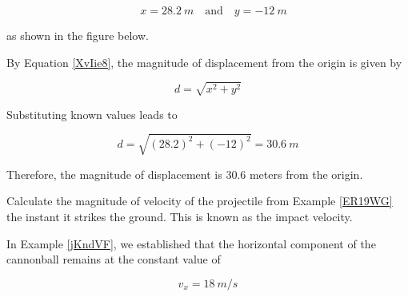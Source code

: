 \documentclass[main-physics.tex]{subfiles}
\begin{document}
\begin{equation*}
    \quad x = \SI{28.2}{m} \quad \text{and} \quad y = \SI{-12}{m}
\end{equation*}

as shown in the figure below.

\begin{center}
\end{center}

By Equation \eqref{XvIie8}, the magnitude of displacement from the origin is given by

\begin{equation*}
    d = \sqrt{x^2 + y^2}
\end{equation*}

Substituting known values leads to

\begin{equation*}
    d = \sqrt{\left(28.2\right)^2 + \left(-12\right)^2} = \SI{30.6}{m}
\end{equation*}

Therefore, the magnitude of displacement is 30.6 meters from the origin.

\endsolution

\begin{example}
    Calculate the magnitude of velocity of the projectile from Example \ref{ER19WG} the instant it strikes the ground. This is known as the impact velocity.
\end{example}

\Solution In Example \ref{jKndVF}, we established that the horizontal component of the cannonball remains at the constant value of

\begin{equation*}
    v_x = \SI{18}{m/s}
\end{equation*}
\end{document}
